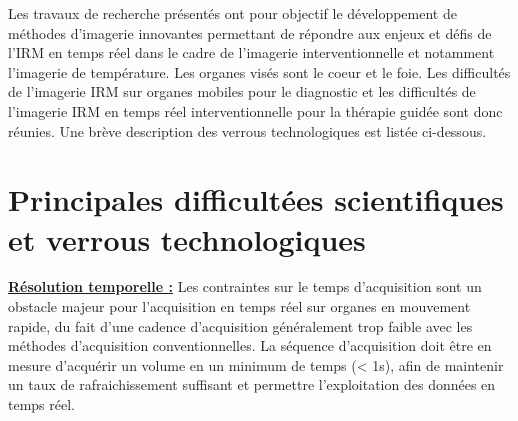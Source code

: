 
Les travaux de recherche présentés ont pour objectif le développement de méthodes d’imagerie innovantes permettant de répondre aux enjeux et défis de l’IRM en temps réel dans le cadre de l’imagerie interventionnelle et notamment l’imagerie de température. Les organes visés sont le coeur et le foie. Les difficultés de l’imagerie IRM sur organes mobiles pour le diagnostic et les difficultés de l’imagerie IRM en temps réel interventionnelle pour la thérapie guidée sont donc réunies. Une brève description des verrous technologiques est listée ci-dessous.

\section{Principales difficultées scientifiques et verrous technologiques}
\label{chap1-verrous}

\underline{\textbf{Résolution temporelle :}} Les contraintes sur le temps d’acquisition sont un obstacle majeur pour l’acquisition en temps réel sur organes en mouvement rapide, du fait d’une cadence d’acquisition généralement trop faible avec les méthodes d’acquisition conventionnelles. La séquence d’acquisition doit être en mesure d’acquérir un volume en un minimum de temps (< 1s), afin de maintenir un taux de rafraichissement suffisant et permettre l’exploitation des données en temps réel.\\
